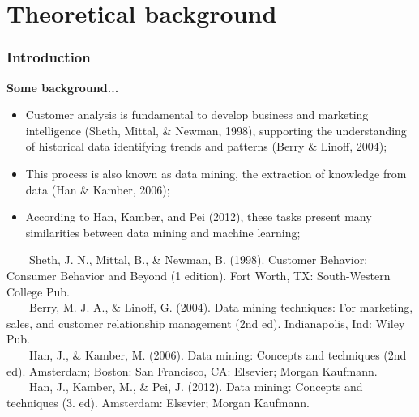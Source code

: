 \documentclass[10pt]{beamer}
\begin{document}
\section{Theoretical background}
\begin{frame}
	\frametitle{Introduction}
	\Large
	\textbf{Some background...}\\
		\begin{itemize} \normalsize
			\item Customer analysis is fundamental to develop business and marketing intelligence \footnotesize(Sheth, Mittal, \& Newman, 1998)\normalsize, supporting the understanding of historical data identifying trends and patterns \footnotesize(Berry \& Linoff, 2004)\normalsize;
			\item This process is also known as data mining, the extraction of knowledge from data \footnotesize(Han \& Kamber, 2006)\normalsize;
			\item According to \footnotesize Han, Kamber, and Pei (2012)\normalsize, these tasks present many similarities between data mining and machine learning; 
		\end{itemize}	
	\tiny
	~~~~Sheth, J. N., Mittal, B., \& Newman, B. (1998). Customer Behavior: Consumer Behavior and Beyond (1 edition). Fort Worth, TX: South-Western College Pub. \\
	~~~~Berry, M. J. A., \& Linoff, G. (2004). Data mining techniques: For marketing, sales, and customer relationship management (2nd ed). Indianapolis, Ind: Wiley Pub.\\
	~~~~Han, J., \& Kamber, M. (2006). Data mining: Concepts and techniques (2nd ed). Amsterdam; Boston: San Francisco, CA: Elsevier; Morgan Kaufmann.\\
	~~~~Han, J., Kamber, M., \& Pei, J. (2012). Data mining: Concepts and techniques (3. ed). Amsterdam: Elsevier; Morgan Kaufmann.\\
\end{frame}
\end{document}
